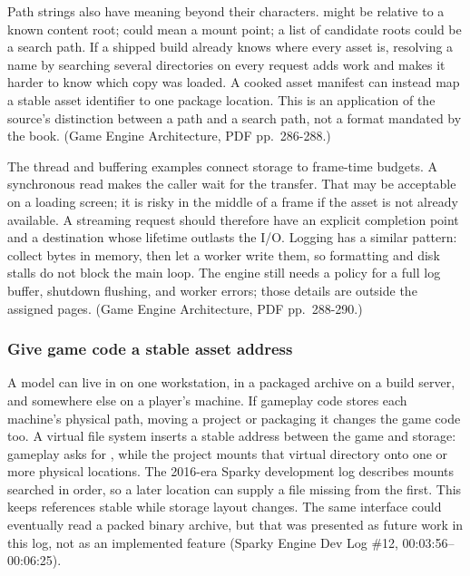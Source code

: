 Path strings also have meaning beyond their characters.  might be relative to a known content root; \BookInlineCode{/} could mean a mount point; a list of candidate roots could be a search path. If a shipped build already knows where every asset is, resolving a name by searching several directories on every request adds work and makes it harder to know which copy was loaded. A cooked asset manifest can instead map a stable asset identifier to one package location. This is an application of the source's distinction between a path and a search path, not a format mandated by the book. (Game Engine Architecture, PDF pp.~286-288.)

The thread and buffering examples connect storage to frame-time budgets. A synchronous read makes the caller wait for the transfer. That may be acceptable on a loading screen; it is risky in the middle of a frame if the asset is not already available. A streaming request should therefore have an explicit completion point and a destination whose lifetime outlasts the I/O. Logging has a similar pattern: collect bytes in memory, then let a worker write them, so formatting and disk stalls do not block the main loop. The engine still needs a policy for a full log buffer, shutdown flushing, and worker errors; those details are outside the assigned pages. (Game Engine Architecture, PDF pp.~288-290.)

\subsubsection{Give game code a stable asset address}\label{06-engine-ii-ch027-give-game-code-a-stable-asset-address}

\hypertarget{06-engine-ii-ch027-give-game-code-a-stable-asset-address}{}

A model can live in  on one workstation, in a packaged archive on a build server, and somewhere else on a player's machine. If gameplay code stores each machine's physical path, moving a project or packaging it changes the game code too. A virtual file system inserts a stable address between the game and storage: gameplay asks for , while the project mounts that virtual directory onto one or more physical locations. The 2016-era Sparky development log describes mounts searched in order, so a later location can supply a file missing from the first. This keeps references stable while storage layout changes. The same interface could eventually read a packed binary archive, but that was presented as future work in this log, not as an implemented feature (Sparky Engine Dev Log \#12, 00:03:56--00:06:25).

